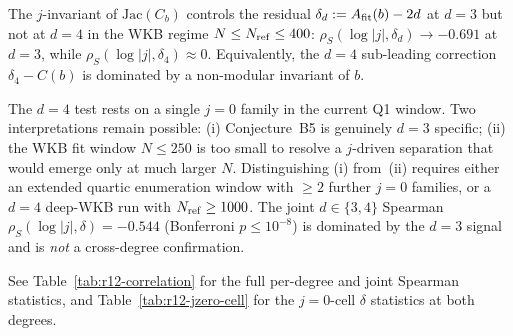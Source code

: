 \begin{conjecture}
\label{conj:b5b6-deg3-specific}
The $j$-invariant of $\mathrm{Jac}(C_b)$ controls the residual
$\delta_d := A_{\rm fit}(b) - 2d$ at $d=3$ but not at $d=4$ in the
WKB regime $N\le N_{\rm ref}\le 400$:
$\rho_S(\log|j|,\delta_d) \to {-0.691}$ at $d=3$, while
$\rho_S(\log|j|,\delta_4) \approx 0$. Equivalently, the $d=4$
sub-leading correction $\delta_4 - C(b)$ is dominated by a
non-modular invariant of $b$.
\end{conjecture}

\begin{remark}
\label{rem:thin-jzero-d4}
The $d=4$ test rests on a single $j=0$ family in the current Q1
window. Two interpretations remain possible: (i) Conjecture~B5 is
genuinely $d=3$ specific; (ii) the WKB fit window $N\le 250$ is too
small to resolve a $j$-driven separation that would emerge only at
much larger $N$. Distinguishing (i) from~(ii) requires either an
extended quartic enumeration window with $\ge 2$ further $j=0$
families, or a $d=4$ deep-WKB run with $N_{\rm ref}\ge 1000$. The
joint $d\in\{3,4\}$ Spearman $\rho_S(\log|j|,\delta) = -0.544$
(Bonferroni $p\le 10^{-8}$) is dominated by the $d=3$ signal and is
\emph{not} a cross-degree confirmation.
\end{remark}

\noindent
See Table~\ref{tab:r12-correlation} for the full per-degree and joint
Spearman statistics, and Table~\ref{tab:r12-jzero-cell} for the
$j=0$-cell $\delta$ statistics at both degrees.

